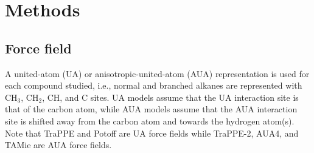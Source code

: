 \documentclass[preprint,review,12pt]{elsarticle}
\begin{document}
	
	
	\section{Methods} \label{Methods}
	
	\subsection{Force field} \label{Force Field}
	
	A united-atom (UA) or anisotropic-united-atom (AUA) representation is used for each compound studied, i.e., normal and branched alkanes are represented with CH$_3$, CH$_2$, CH, and C sites. UA models assume that the UA interaction site is that of the carbon atom, while AUA models assume that the AUA interaction site is shifted away from the carbon atom and towards the hydrogen atom(s). Note that TraPPE and Potoff are UA force fields while TraPPE-2, AUA4, and TAMie are AUA force fields. 
	
\end{document}
